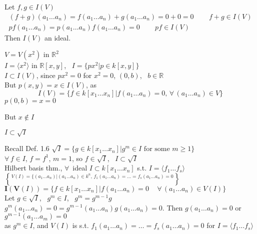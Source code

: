 \documentclass[10pt]{amsart}
\newcommand{\exercisehead}[1]
  { \smallskip
   \noindent{\small\bf Exercise #1.}
  }
\begin{document}
\begin{multicols*}{2}
Let $f,g \in I(V)$ 
\[
\begin{gathered}
  (f+g)(a_1 \dots a_n) = f(a_1 \dots a_n) + g(a_1 \dots a_n) = 0 + 0 = 0 \quad \quad \, f+g \in I(V) \\ 
  pf(a_1 \dots a_n) = p(a_1 \dots a_n) f(a_1 \dots a_n) = 0 \quad \quad \, pf \in I(V)
\end{gathered}
\]
Then $I(V)$ an ideal.



$V = V(x^2)$ in $\mathbb{R}^2$ \\
$I=\langle x^2 \rangle$ in $\mathbb{R}[x,y]$, \, $I= \lbrace px^2 | p \in k[x,y]\rbrace$ \\
\phantom{ \quad } $I \subset I(V)$, since $px^2 = 0$ for $x^2=0$, $(0,b)$, \, $b\in \mathbb{R}$ \\
But $p(x,y) = x\in I(V)$, as 
\[
I(V) = \lbrace f \in k[x_1 \dots x_n] | f(a_1 \dots a_n)=0, \, \forall \, (a_1\dots a_n) \in V\rbrace
\]
\phantom{ \quad \quad } $p(0,b) = x = 0$

But $x\notin I$

\exercisehead{4} $I\subset \sqrt{I}$

Recall Def. 1.6 $\sqrt{I} = \lbrace g \in k[x_1 \dots x_n] |g^m \in I \text{ for some } m\geq 1\rbrace$ \\
$\forall \, f \in I$, $f=f^1$, $m=1$, so $f\in \sqrt{I}$, \quad \, $I\subset \sqrt{I}$ \\
\phantom{\quad \quad } Hilbert basis thm., $\forall \, $ ideal $I\subset k[x_1 \dots x_n]$ s.t. $I=\langle f_1 \dots f_s \rangle$ \\
\phantom{\quad } $V(I) = \lbrace (a_1 \dots a_n) |(a_1 \dots a_n) \in k^n, \, f_1(a_1\dots a_n) = \dots = f_s(a_1\dots a_n)=0\brace$ \\
$\mathbf{I}(\mathbf{V}(I)) = \lbrace f \in k[x_1 \dots x_n] | f(a_1 \dots a_n) =0 \quad \, \forall \, (a_1 \dots a_n) \in V(I) \rbrace$ \\
Let $g\in \sqrt{I}$, \, $g^m \in I$, \, $g^m=g^{m-1}g$  \\
\phantom{\quad \quad \,} $g^m(a_1 \dots a_n) =0 = g^{m-1}(a_1 \dots a_n)g(a_1 \dots a_n) =0$.  Then $g(a_1 \dots a_n)=0$ or $g^{m-1}(a_1\dots a_m)=0$ \\
\phantom{\quad }as $g^m\in I$, and $V(I)$ is s.t. $f_1(a_1 \dots a_n) = \dots = f_s(a_1 \dots a_n)=0$ for $I=\langle f_1 \dots f_s \rangle$


\end{multicols*}
\end{document}
